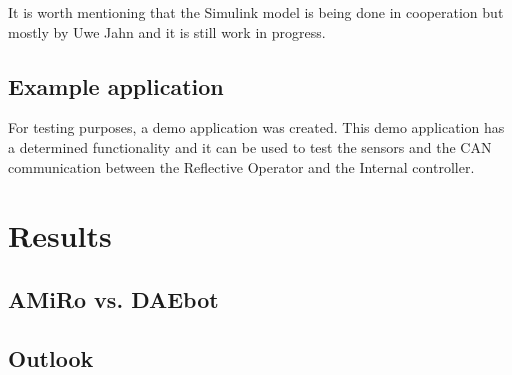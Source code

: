 \documentclass[12pt]{report}%
\begin{document}
It is worth mentioning that the Simulink model is being done in cooperation but mostly by Uwe Jahn and it is still work in progress.

\section{Example application}
\label{sect:example}
For testing purposes, a demo application was created. This demo application has a determined functionality and it can be used to test the sensors and the CAN communication between the Reflective Operator and the Internal controller.

\chapter{Results}
\section{AMiRo vs. DAEbot}

\section{Outlook}

\printbibliography
\nocite{*}
\end{document}

